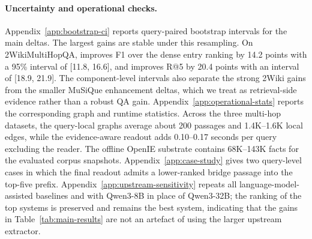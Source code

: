 \begin{table}[t]
\centering
\scriptsize
\setlength{\tabcolsep}{3pt}
\caption{Operational statistics for \methodname{} on the 1{,}000-query
multi-hop runs. Docs and facts describe the offline corpus substrate.
Local docs, local edges, flow iterations, and readout time are
query-time averages before the GPT-4o-mini reader.}
\label{tab:main-efficiency}
\end{table}

\paragraph{Uncertainty and operational checks.}
Appendix~\ref{app:bootstrap-ci} reports query-paired bootstrap
intervals for the main deltas. The largest gains are stable under this
resampling. On 2WikiMultiHopQA, \methodname{} improves F1 over the dense
entry ranking by 14.2 points with a 95\% interval of [11.8, 16.6], and
improves R@5 by 20.4 points with an interval of [18.9, 21.9]. The
component-level intervals also separate the strong 2Wiki gains from the
smaller MuSiQue enhancement deltas, which we treat as retrieval-side
evidence rather than a robust QA gain. Appendix~\ref{app:operational-stats}
reports the corresponding graph and runtime statistics. Across the
three multi-hop datasets, the query-local graphs average about 200
passages and 1.4K--1.6K local edges, while the evidence-aware readout
adds 0.10--0.17 seconds per query excluding the reader. The offline
OpenIE substrate contains 68K--143K facts for the evaluated corpus
snapshots. Appendix~\ref{app:case-study} gives two query-level cases in
which the final readout admits a lower-ranked bridge passage into the
top-five prefix. Appendix~\ref{app:upstream-sensitivity} repeats all
language-model-assisted baselines and \methodname{} with Qwen3-8B in
place of Qwen3-32B; the ranking of the top systems is preserved and
\methodname{} remains the best system, indicating that the gains in
Table~\ref{tab:main-results} are not an artefact of using the larger
upstream extractor.
